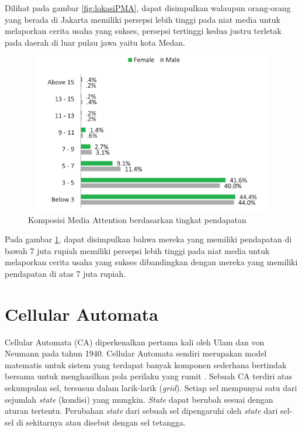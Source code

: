 Dilihat pada gambar \ref{fig:lokasiPMA}, dapat disimpulkan walaupun orang-orang yang berada di Jakarta memiliki persepsi lebih tinggi pada niat media untuk melaporkan cerita usaha yang sukses, persepsi tertinggi kedua justru terletak pada daerah di luar pulau jawa yaitu kota Medan.

\begin{figure} [H]
	\centering  
	\includegraphics[width=12cm, height=7cm]{pendapatanPMA2013} 
	\caption[Komposisi Media Attention berdasarkan tingkat pendapatan]{Komposisi Media Attention berdasarkan tingkat pendapatan} 
	\label{fig:pendapatanPMA} 
\end{figure} 

Pada gambar \ref{fig:pendapatanPMA}, dapat disimpulkan bahwa mereka yang memiliki pendapatan di bawah 7 juta rupiah memiliki persepsi lebih tinggi pada niat media untuk melaporkan cerita usaha yang sukses dibandingkan dengan mereka yang memiliki pendapatan di atas 7 juta rupiah.

\section{Cellular Automata}
\label{sec:cellularautomata}

Cellular Automata (CA) diperkenalkan pertama kali oleh Ulam dan von Neumann pada tahun 1940. Cellular Automata sendiri merupakan model matematis untuk sistem yang terdapat banyak komponen sederhana bertindak bersama untuk menghasilkan pola perilaku yang rumit \cite{referensiCA2}. Sebuah CA terdiri atas sekumpulan sel, tersusun dalam larik-larik (\textit{grid}). Setiap sel mempunyai satu dari sejumlah \textit{state} (kondisi) yang mungkin. \textit{State} dapat berubah sesuai dengan aturan tertentu. Perubahan \textit{state} dari sebuah sel dipengaruhi oleh \textit{state} dari sel-sel di sekitarnya atau disebut dengan sel tetangga.

